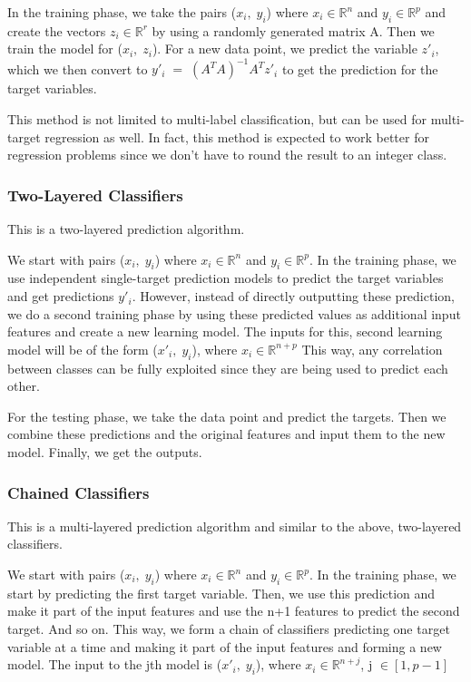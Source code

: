 \documentclass[letterpaper, 11 pt, conference]{IEEEtran}  %
\begin{document}
In the training phase, we take the pairs ($x_i,\;y_i$) where $x_i \in \mathbb{R}^n$ and $y_i \in \mathbb{R}^p$ and create the vectors $z_i \in \mathbb{R}^r$  by using a randomly generated matrix A. Then we train the model for ($x_i,\;z_i$). For a new data point, we predict the variable $z'_i$, which we then convert to $y'_i\;=\;(A^TA)^{-1}A^Tz'_i$ to get the prediction for the target variables.

This method is not limited to multi-label classification, but can be used for multi-target regression as well. In fact, this method is expected to work better for regression problems since we don't have to round the result to an integer class.

\subsubsection{\textbf{Two-Layered Classifiers}}
This is a two-layered prediction algorithm.

We start with pairs ($x_i,\;y_i$) where $x_i \in \mathbb{R}^n$ and $y_i \in \mathbb{R}^p$. In the training phase, we use independent single-target prediction models to predict the target variables and get predictions $y'_i$. However, instead of directly outputting these prediction, we do a second training phase by using these predicted values as additional input features and create a new learning model. The inputs for this, second learning model will be of the form ($x'_i,\;y_i$), where $x_i \in \mathbb{R}^{n+p}$  This way, any correlation between classes can be fully exploited since they are being used to predict each other.

For the testing phase, we take the data point and predict the targets. Then we combine these predictions and the original features and input them to the new model. Finally, we get the outputs.

\subsubsection{\textbf{Chained Classifiers}}
This is a multi-layered prediction algorithm and similar to the above, two-layered classifiers. 

We start with pairs ($x_i,\;y_i$) where $x_i \in \mathbb{R}^n$ and $y_i \in \mathbb{R}^p$. In the training phase, we start by predicting the first target variable. Then, we use this prediction and make it part of the input features and use the n+1 features to predict the second target. And so on. This way, we form a chain of classifiers predicting one target variable at a time and making it part of the input features and forming a new model. The input to the jth model is ($x'_i,\;y_i$), where $x_i \in \mathbb{R}^{n+j}$, j $\in [1,p-1]$
\end{document}
